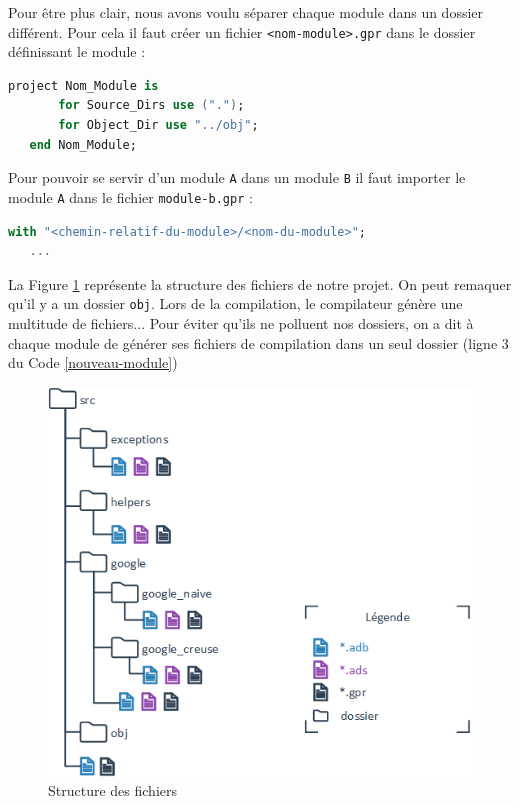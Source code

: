 Pour être plus clair, nous avons voulu séparer chaque module dans un dossier différent.
Pour cela il faut créer un fichier \lstinline{<nom-module>.gpr} dans le dossier définissant le module : 
\begin{lstlisting}[language=Ada, caption={Fichier générique *.gpr définissant un nouveau module}, label={nouveau-module}]
   project Nom_Module is
       for Source_Dirs use (".");
       for Object_Dir use "../obj";
   end Nom_Module;
\end{lstlisting}

Pour pouvoir se servir d'un module \lstinline{A} dans un module \lstinline{B} il faut importer le module \lstinline{A} dans le fichier \lstinline{module-b.gpr} : 
\begin{lstlisting}[language=Ada, caption={Import de module}]
   with "<chemin-relatif-du-module>/<nom-du-module>";
   ...
\end{lstlisting}

La Figure \ref*{fig : structure_fichiers_projet} représente la structure des fichiers de notre projet. On peut remaquer qu'il y a un dossier \lstinline{obj}. Lors de la compilation, le compilateur génère une multitude de fichiers... Pour éviter qu'ils ne polluent nos dossiers, on a dit à chaque module de générer ses fichiers de compilation dans un seul dossier (ligne 3 du Code \ref*{nouveau-module})

\begin{figure}[ht!]
   \centering
   \includegraphics[scale=0.8]{partie-2/sous-partie-2/structure_fichier.png}
   \caption{Structure des fichiers \label{fig : structure_fichiers_projet}}
\end{figure}

